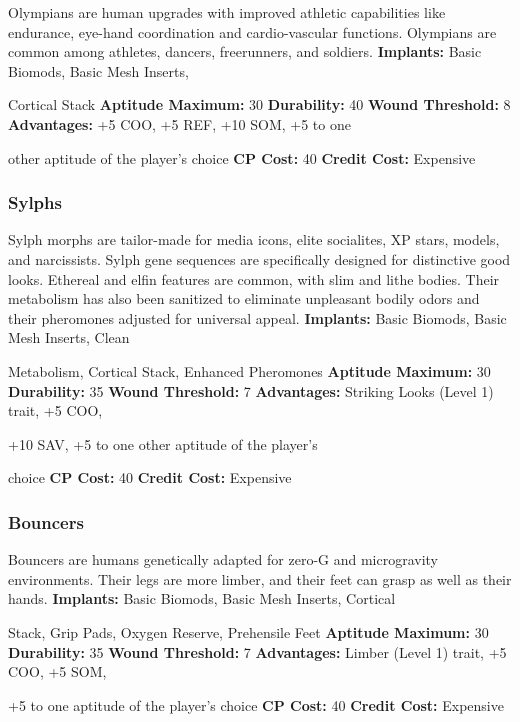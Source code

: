 Olympians are human upgrades with improved 
athletic capabilities like endurance, eye-hand coordination
and cardio-vascular functions. Olympians
are common among athletes, dancers, freerunners, 
and soldiers.
\textbf{Implants: }Basic Biomods, Basic Mesh Inserts, 

Cortical Stack
\textbf{Aptitude Maximum: }30
\textbf{Durability: }40
\textbf{Wound Threshold: }8
\textbf{Advantages: }+5 COO, +5 REF, +10 SOM, +5 to one 

other aptitude of the player's choice
\textbf{CP Cost: }40
\textbf{Credit Cost: }Expensive

\subsubsection{Sylphs}

Sylph morphs are tailor-made for media icons, elite 
socialites, XP stars, models, and narcissists. Sylph 
gene sequences are specifically designed for distinctive
good looks. Ethereal and elfin features are
common, with slim and lithe bodies. Their metabolism
has also been sanitized to eliminate unpleasant
bodily odors and their pheromones adjusted for 
universal appeal.
\textbf{Implants: }Basic Biomods, Basic Mesh Inserts, Clean 

Metabolism, Cortical Stack, Enhanced Pheromones
\textbf{Aptitude Maximum: }30
\textbf{Durability: }35
\textbf{Wound Threshold: }7
\textbf{Advantages: }Striking Looks (Level 1) trait, +5 COO, 

+10 SAV, +5 to one other aptitude of the player's 

choice
\textbf{CP Cost:} 40
\textbf{Credit Cost: }Expensive

\subsubsection{Bouncers}

Bouncers are humans genetically adapted for zero-G 
and microgravity environments. Their legs are more 
limber, and their feet can grasp as well as their hands.
\textbf{Implants: }Basic Biomods, Basic Mesh Inserts, Cortical 

Stack, Grip Pads, Oxygen Reserve, Prehensile Feet
\textbf{Aptitude Maximum: }30
\textbf{Durability: }35
\textbf{Wound Threshold: }7
\textbf{Advantages:} Limber (Level 1) trait, +5 COO, +5 SOM, 

+5 to one aptitude of the player's choice
\textbf{CP Cost: }40
\textbf{Credit Cost: }Expensive

